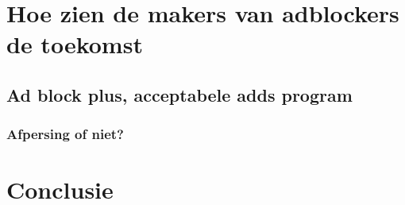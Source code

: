 \documentclass[pdftex,a4paper,12pt,twoside]{report}
\begin{document}
\chapter{Hoe zien de makers van adblockers de toekomst}
\label{ch:Hoe zien de makers van adblockers de toekomst}

\section{Ad block plus, acceptabele adds program}
\label{sec:Ad block plus, acceptabele adds program}
\subsection{Afpersing of niet?}
\label{sec Afpersing of niet}


\chapter{Conclusie}
\label{ch:conclusie}








\listoffigures
\listoftables
\end{document}
